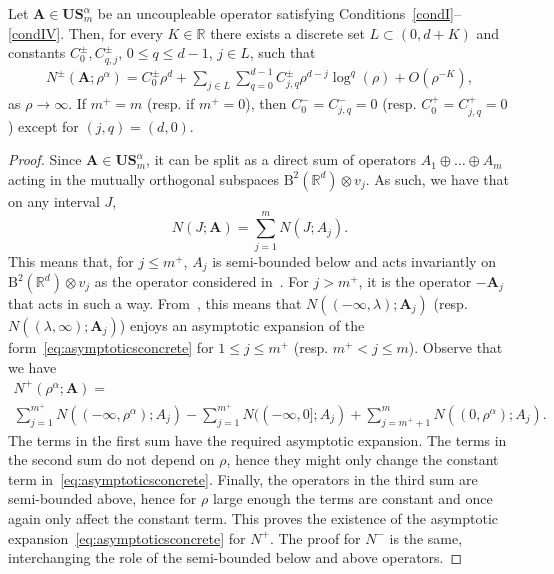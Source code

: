 \documentclass[10pt]{amsart}
\theoremstyle{definition}\newtheorem{defi}[theo]{Definition}\newtheorem{rema}[theo]{Remark}\newtheorem{exam}[theo]{Example}\newtheorem{nota}[theo]{Notation}
\newcommand{\RB}{\mathrm{B}}
\newcommand{\R}{\mathbb R}
\newcommand{\BA}{\mathbf A}
\newcommand{\BS}{\mathbf S}
\newcommand{\BU}{\mathbf U}
\newcommand{\pd}{uncoupleable}
\newcommand{\bigo}[1]{O\left(#1 \right)}
\begin{document}
\begin{prop}\label{thm:aexpconcreteu}
Let $\BA \in \BU\BS^{\alpha}_m$ be an \pd{} operator satisfying Conditions~\ref{condI}--\ref{condIV}. Then, for every $K \in \R$ there exists a discrete set $L \subset (0,d+K)$ and constants $C_0^\pm, C_{q,j}^\pm$, $0 \le q \le d-1$, $j \in L$, such that
\begin{equation}\label{eq:asymptoticsconcreteunc}
\begin{aligned}
N^\pm\left(\BA; \rho^\alpha \right) = C_0^\pm \rho^d +
\sum_{j\in L}\sum_{q =0}^{d-1} C_{j,q}^\pm \rho^{d-j} \log^q(\rho) + \bigo{\rho^{-K}},
\end{aligned}
\end{equation}
as $\rho \to \infty$. If $m^+ = m$ (resp. if $m^+ = 0$), then $C^-_0 = C^-_{j,q} = 0$ (resp. $C_0^+ = C^+_{j,q} = 0$) except for $(j,q) = (d,0)$.
\end{prop}
\begin{proof}
Since $\BA \in \BU\BS_m^\alpha$, it can be split as a direct sum of operators $A_1 \oplus \dotso \oplus A_m$ acting in the mutually orthogonal subspaces $\RB^2(\R^d) \otimes v_j$. As such, we have that on any interval $J$,
\begin{equation}\label{eq:sumIDS}
N(J;\BA) = \sum_{j=1}^m N(J;A_j).
\end{equation}
This means that, for $j\le m^+$, $A_j$ is semi-bounded below and acts invariantly on $\RB^2(\R^d) \otimes v_j$ as the operator considered in~\cite{MorParSht2014}. For $j > m^+$, it is the operator $-\BA_j$ that acts in such a way. From~\cite[Theorem~2.5]{MorParSht2014}, this means that $N((-
\infty,\lambda);\BA_j)$ (resp. $N((\lambda,\infty); \BA_j)$) enjoys an asymptotic expansion of the form~\eqref{eq:asymptoticsconcrete} for $1 \le j \le m^+$ (resp. $m^+ < j \le m$). Observe that we have
\begin{multline}\label{eq:sumIDSsplit}
N^+\left(\rho^\alpha;\BA\right)=\\ \sum_{j=1}^{m^+} N((-\infty,\rho^\alpha);A_j) - \sum_{j=1}^{m^+} N((-\infty,0];A_j)
+ \sum_{j=m^++1}^m N((0,\rho^\alpha);A_j).
\end{multline}
The terms in the first sum have the required asymptotic expansion. The terms in the second sum do not depend on $\rho$, hence they might only change the constant term in~\eqref{eq:asymptoticsconcrete}. Finally, the operators in the third sum are semi-bounded above, hence for $\rho$ large enough the terms are constant and once again only affect the constant term. This proves the existence of the asymptotic expansion~\eqref{eq:asymptoticsconcrete} for $N^+$. The proof for $N^-$ is the same, interchanging the role of the semi-bounded below and above operators.
\end{proof}
\end{document}
